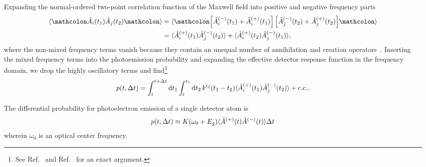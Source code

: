 Expanding the normal-ordered two-point correlation function of the Maxwell field into positive and negative frequency parts
\begin{equation}
	\begin{split}
		\expval{
			\norder{
				\hat{A}_i(t_1)
				\hat{A}_j(t_2)
			}
		}
		&=
		\expval{
			\norder{
				\left[
					\hat{A}_i^{(-)}(t_1)
					+
					\hat{A}_i^{(+)}(t_1)
				\right]
				\left[
					\hat{A}_j^{(-)}(t_2)
					+
					\hat{A}_j^{(+)}(t_2)
				\right]
			}
		}
		\\
		&=
		\expval{
			\hat{A}_i^{(+)}(t_1)
			\hat{A}_j^{(-)}(t_2)
		}
		+
		\expval{
			\hat{A}_i^{(+)}(t_2)
			\hat{A}_j^{(-)}(t_1)
		}
		,
	\end{split}
\end{equation}
where the non-mixed frequency terms vanish because they contain an unequal number of annihilation and creation operators~\cite[p.~134]{Cohen1992}.
Inserting the mixed frequency terms into the photoemission probability and expanding the effective detector response function in the frequency domain, we drop the highly oscillatory terms and find\footnote{See Ref.~\cite[p.~697]{Mandel1995} and Ref.~\cite[p.~136]{Cohen1992} for an exact argument.}
\begin{equation}
	p(t,\Delta t)
	=
	\int_t^{t+\Delta t}\dd{t_1}
	\int_t^{t_1}
	\dd{t_2}
	k^{ij}(t_1-t_2)
	\expval{
		\hat{A}_i^{(+)}(t_1)
		\hat{A}_j^{(-)}(t_2)
	}
	+
	\text{c.c.}
	.
\end{equation}

The differential probability for photoelectron emission of a single detector atom is~\cite{Kimble1984}
\begin{equation}
	p(t,\Delta t)
	\approx
	K(\omega_0+E_g)
	\langle
		\hat{A}^{(+)}(t)
		\hat{A}^{(-)}(t)
	\rangle
	\Delta t
	\label{eq:differential_photoemission_probability}
\end{equation}
wherein $\omega_0$ is an optical center frequency.
